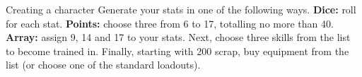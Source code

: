 
\begin{abstractsection}{Creating a character}
Generate your stats in one of the following ways. \textbf{Dice:} roll  for each stat. \textbf{Points:} choose three from 6 to 17, totalling no more than 40. \textbf{Array:} assign 9, 14 and 17 to your stats. Next, choose three skills from the list to become trained in. Finally, starting with 200 scrap, buy equipment from the list (or choose one of the standard loadouts).
\end{abstractsection}
